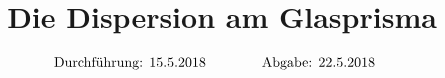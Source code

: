 

\subject{V402}
\title{Die Dispersion am Glasprisma}
\date{
  \begin{align}
    \text{Durchführung: } & \text{15.5.2018} & \hspace{3em} & \text{Abgabe: 22.5.2018} \notag
  \end{align}
}


\maketitle
\thispagestyle{empty}
\tableofcontents
\newpage






\printbibliography{}


